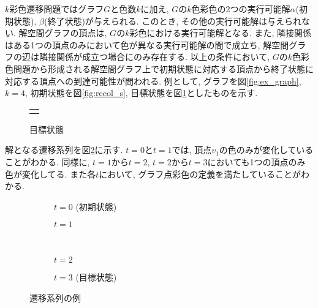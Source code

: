 $k$彩色遷移問題ではグラフ$G$と色数$k$に加え, $G$の$k$色彩色の2つの実行可能解$\alpha$(初期状態), $\beta$(終了状態)が与えられる. 
このとき, その他の実行可能解は与えられない. 
解空間グラフの頂点は, $G$の$k$彩色における実行可能解となる.
また, 隣接関係はある1つの頂点のみにおいて色が異なる実行可能解の間で成立ち, 解空間グラフの辺は隣接関係が成立つ場合にのみ存在する.
以上の条件において, $G$の$k$色彩色問題から形成される解空間グラフ上で初期状態に対応する頂点から終了状態に対応する頂点への到達可能性が問われる. 
例として, グラフを図\ref{fig:ex_graph}, $k=4$, 初期状態を図\ref{fig:recol_s}, 目標状態を図\ref{fig:recol_g}としたものを示す.

\begin{figure}[htbp]
  \centering
  \begin{tabular}{c}

    \begin{minipage}{0.45\hsize}
      \centering
      
      \caption{初期状態}
      \label{fig:recol_s}
    \end{minipage}

    \begin{minipage}{0.45\hsize}
      \centering
      
      \caption{目標状態}
      \label{fig:recol_g}
    \end{minipage}
    
  \end{tabular}
\end{figure}

\noindent
解となる遷移系列を図\ref{fig:ans_varrecol}に示す. $t=0$と$t=1$では, 頂点$v_1$の色のみが変化していることがわかる. 
同様に, $t=1$から$t=2$, $t=2$から$t=3$においても1つの頂点のみ色が変化してる. 
また各$t$において, グラフ点彩色の定義を満たしていることがわかる.

\begin{figure}[htbp]
  \centering
  \begin{subfigure}{0.4\hsize}
    \centering
    
    \caption{$t=0$ (初期状態)}
   \end{subfigure}
   \hspace{1cm}
   \begin{subfigure}{0.4\hsize}
    \centering
    
    \caption{$t=1$}
   \end{subfigure}
   \\
   \begin{subfigure}{0.4\hsize}
    \centering
    
    \caption{$t=2$}
   \end{subfigure}
   \hspace{1cm}
   \begin{subfigure}{0.4\hsize}
    \centering
    
    \caption{$t=3$ (目標状態)}
   \end{subfigure}

   \caption{遷移系列の例}
   \label{fig:ans_varrecol}
\end{figure}


